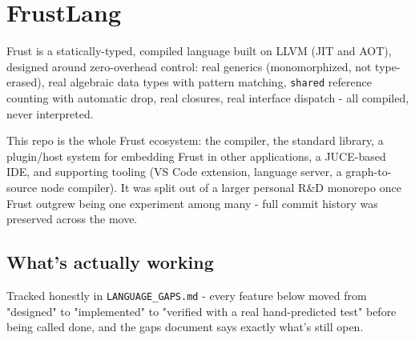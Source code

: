 \documentclass{book}
\begin{document}
\chapter{FrustLang}

Frust is a statically-typed, compiled language built on LLVM (JIT and
AOT), designed around zero-overhead control: real generics
(monomorphized, not type-erased), real algebraic data types with
pattern matching, \texttt{shared} reference counting with automatic drop, real
closures, real interface dispatch - all compiled, never interpreted.

This repo is the whole Frust ecosystem: the compiler, the standard
library, a plugin/host system for embedding Frust in other
applications, a JUCE-based IDE, and supporting tooling (VS Code
extension, language server, a graph-to-source node compiler). It was
split out of a larger personal R&D monorepo once Frust outgrew being
one experiment among many - full commit history was preserved across
the move.

\section{What's actually working}

Tracked honestly in
\texttt{LANGUAGE_GAPS.md} -
every feature below moved from "designed" to "implemented" to
"verified with a real hand-predicted test" before being called done,
and the gaps document says exactly what's still open.
\end{document}

